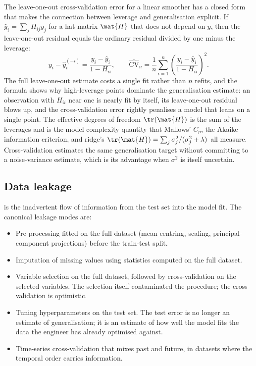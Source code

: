 \begin{mastery}
The leave-one-out cross-validation error for a linear smoother has
a closed form that makes the connection between leverage and
generalisation explicit. If $\hat{y}_{i} = \sum_{j} H_{ij} y_{j}$
for a hat matrix $\mat{H}$ that does not depend on $y$, then the
leave-one-out residual equals the ordinary residual divided by one
minus the leverage:
\[
y_{i} - \hat{y}_{i}^{(-i)} = \frac{y_{i} - \hat{y}_{i}}{1 - H_{ii}},
\qquad
\widehat{\mathrm{CV}}_{n} = \frac{1}{n}\sum_{i=1}^{n}
\left(\frac{y_{i} - \hat{y}_{i}}{1 - H_{ii}}\right)^{2}.
\]
The full leave-one-out estimate costs a single fit rather than $n$
refits, and the formula shows why high-leverage points dominate the
generalisation estimate: an observation with $H_{ii}$ near one is
nearly fit by itself, its leave-one-out residual blows up, and the
cross-validation error rightly penalises a model that leans on a
single point. The effective degrees of freedom $\tr(\mat{H})$ is
the sum of the leverages and is the model-complexity quantity that
Mallows' $C_{p}$, the Akaike information criterion, and ridge's
$\tr(\mat{H}) = \sum_{j}\sigma_{j}^{2}/(\sigma_{j}^{2} + \lambda)$
all measure. Cross-validation estimates the same generalisation
target without committing to a noise-variance estimate, which is its
advantage when $\sigma^{2}$ is itself uncertain.
\end{mastery}

\subsection{Data leakage}

 is the inadvertent flow of information from
the test set into the model fit. The canonical leakage modes are:

\begin{itemize}[leftmargin=*]
  \item Pre-processing fitted on the full dataset (mean-centring,
    scaling, principal-component projections) before the
    train-test split.
  \item Imputation of missing values using statistics computed on
    the full dataset.
  \item Variable selection on the full dataset, followed by
    cross-validation on the selected variables. The selection
    itself contaminated the procedure; the cross-validation is
    optimistic.
  \item Tuning hyperparameters on the test set. The test error is
    no longer an estimate of generalisation; it is an estimate of
    how well the model fits the data the engineer has already
    optimised against.
  \item Time-series cross-validation that mixes past and future,
    in datasets where the temporal order carries information.
\end{itemize}

